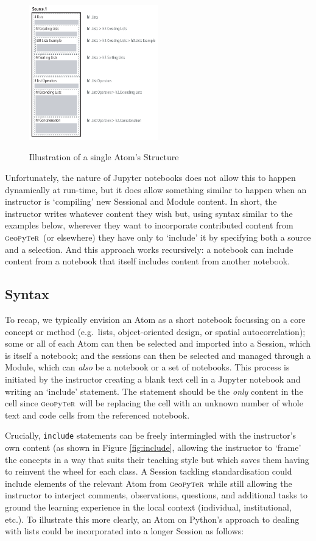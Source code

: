 \documentclass[letter, 11pt,titlepage]{article}
\newcommand{\gp}{\textsc{g}eo\textsc{p}y\textsc{t}e\textsc{r}~\/}
\newcommand{\eg}{e.g.~\/}
\begin{document}
\begin{figure}[htbp]
  \centering
  \caption{Illustration of a single Atom's Structure}
  \includegraphics[width=0.5\textwidth]{Single_Document.pdf}
  \label{fig:structure}
\end{figure}

Unfortunately, the nature of Jupyter notebooks does not allow this to happen dynamically at run-time, but it does allow something similar to happen when an instructor is `compiling' new Sessional and Module content. In short, the instructor writes whatever content they wish but, using syntax similar to the examples below, wherever they want to incorporate contributed content from \gp (or elsewhere) they have only to `include' it by specifying both a source and a selection. And this approach works recursively: a notebook can include content from a notebook that itself includes content from another notebook.
\subsection{Syntax}\label{syntax}

To recap, we typically envision an Atom as a short notebook focussing on a core concept or method (\eg lists, object-oriented design, or spatial autocorrelation); some or all of each Atom can then be selected and imported into a Session, which is itself a notebook; and the sessions can then be selected and managed through a Module, which can \emph{also} be a notebook or a set of notebooks. This process is initiated by the instructor creating a blank text cell in a Jupyter notebook and writing an `include' statement. The statement should be the \emph{only} content in the cell since \gp will be replacing the cell with an unknown number of whole text and code cells from the referenced notebook.

Crucially, \texttt{include} statements can be freely intermingled with the instructor's own content (as shown in Figure \ref{fig:include}, allowing the instructor to `frame' the concepts in a way that suits their teaching style but which saves them having to reinvent the wheel for each class. A Session tackling standardisation could include elements of the relevant Atom from \gp while still allowing the instructor to interject comments, observations, questions, and additional tasks to ground the learning experience in the local context (individual, institutional, etc.). To illustrate this more clearly, an Atom on Python's approach to dealing with lists could be incorporated into a longer Session as follows:
\end{document}
